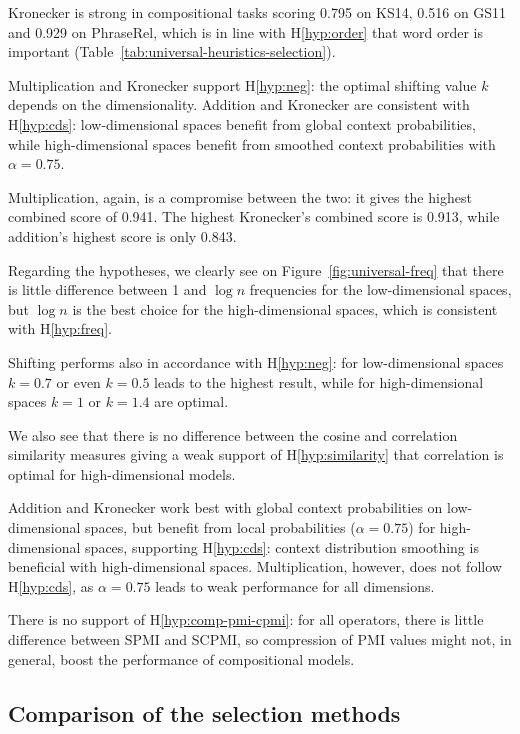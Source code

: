 Kronecker is strong in compositional tasks scoring 0.795 on KS14, 0.516 on GS11 and 0.929 on PhraseRel, which is in line with H\ref{hyp:order} that word order is important (Table~\ref{tab:universal-heuristics-selection}).

Multiplication and Kronecker support H\ref{hyp:neg}: the optimal shifting value $k$ depends on the dimensionality. Addition and Kronecker are consistent with H\ref{hyp:cds}: low-dimensional spaces benefit from global context probabilities, while high-dimensional spaces benefit from smoothed context probabilities with $\alpha=0.75$.

Multiplication, again, is a compromise between the two: it gives the highest combined score of 0.941. The highest Kronecker's combined score is 0.913, while addition's highest score is only 0.843.

Regarding the hypotheses, we clearly see on Figure~\ref{fig:universal-freq} that there is little difference between 1 and $\log n$ frequencies for the low-dimensional spaces, but $\log n$ is the best choice for the high-dimensional spaces, which is consistent with H\ref{hyp:freq}.

Shifting performs also in accordance with H\ref{hyp:neg}: for low-dimensional spaces $k=0.7$ or even $k=0.5$ leads to the highest result, while for high-dimensional spaces $k=1$ or $k=1.4$ are optimal.

We also see that there is no difference between the cosine and correlation similarity measures giving a weak support of H\ref{hyp:similarity} that correlation is optimal for high-dimensional models.

Addition and Kronecker work best with global context probabilities on low-dimensional spaces, but benefit from local probabilities ($\alpha=0.75$) for high-dimensional spaces, supporting H\ref{hyp:cds}: context distribution smoothing is beneficial with high-dimensional spaces. Multiplication, however, does not follow H\ref{hyp:cds}, as $\alpha=0.75$ leads to weak performance for all dimensions.

There is no support of H\ref{hyp:comp-pmi-cpmi}: for all operators, there is little difference between SPMI and SCPMI, so compression of PMI values might not, in general, boost the performance of compositional models.

\subsection{Comparison of the selection methods}
\label{sec:comparison-universal}

